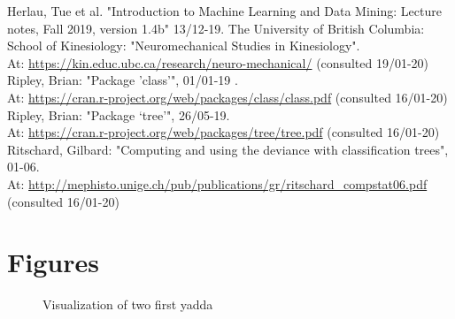 \documentclass[11pt,fleqn]{article}
\begin{document}
\begin{thebibliography}{9}
	 Herlau, Tue et al. "Introduction to Machine Learning and Data Mining: Lecture notes, Fall 2019, version 1.4b" 13/12-19.
		 The University of British Columbia: School of Kinesiology:
	"Neuromechanical Studies in Kinesiology". \\
	At:
	\url{https://kin.educ.ubc.ca/research/neuro-mechanical/} (consulted 19/01-20)
	 Ripley, Brian: "Package ’class’", 01/01-19 .\\
	At:
	\url{https://cran.r-project.org/web/packages/class/class.pdf} (consulted 16/01-20)
	 Ripley, Brian: "Package ‘tree’", 26/05-19.\\ At: \url{https://cran.r-project.org/web/packages/tree/tree.pdf} (consulted 16/01-20)
	 Ritschard, Gilbard: "Computing and using the deviance with classification trees", 01-06.\\
	 At:
	\url{http://mephisto.unige.ch/pub/publications/gr/ritschard_compstat06.pdf} (consulted 16/01-20)

\end{thebibliography}
\appendix
\section{Figures}
\begin{figure}[H]
	
	\centering
	\caption{Visualization of two first yadda}
	\label{fig:2dtrajects}
\end{figure}
\end{document}
